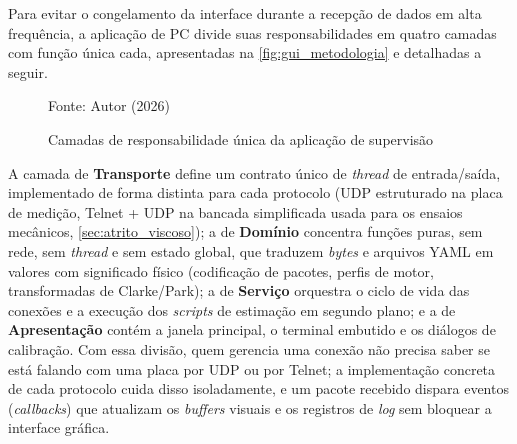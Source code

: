 Para evitar o congelamento da interface durante a recepção de dados em alta
frequência, a aplicação de PC divide suas responsabilidades em quatro camadas
com função única cada, apresentadas na \autoref{fig:gui_metodologia} e
detalhadas a seguir.

\begin{figure}[H]
    \centering
    \caption{Camadas de responsabilidade única da aplicação de supervisão}
    \label{fig:gui_metodologia}

    Fonte: Autor (2026)
\end{figure}

A camada de \textbf{Transporte} define um contrato único de \textit{thread} de
entrada/saída, implementado de forma distinta para cada protocolo (UDP
estruturado na placa de medição, Telnet + UDP na bancada simplificada usada para os
ensaios mecânicos, \autoref{sec:atrito_viscoso}); a de \textbf{Domínio}
concentra funções puras, sem rede, sem \textit{thread} e sem estado global,
que traduzem \textit{bytes} e arquivos YAML em valores com significado físico
(codificação de pacotes, perfis de motor, transformadas de Clarke/Park); a de
\textbf{Serviço} orquestra o ciclo de vida das conexões e a execução dos
\textit{scripts} de estimação em segundo plano; e a de \textbf{Apresentação}
contém a janela principal, o terminal embutido e os diálogos de calibração.
Com essa divisão, quem gerencia uma conexão não precisa saber se está falando
com uma placa por UDP ou por Telnet; a implementação concreta de cada
protocolo cuida disso isoladamente, e um pacote recebido dispara eventos
(\textit{callbacks}) que atualizam os \textit{buffers} visuais e os registros
de \textit{log} sem bloquear a interface gráfica.

